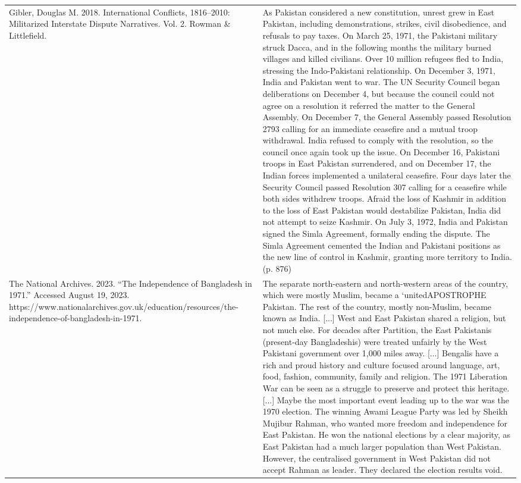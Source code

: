 {\begin{longtable}{p{}p{}}
Gibler, Douglas M. 2018. International Conflicts, 1816–2010: Militarized Interstate Dispute Narratives. Vol. 2. Rowman \& Littlefield. & As Pakistan considered a new constitution, unrest grew in East Pakistan, including demonstrations, strikes, civil disobedience, and refusals to pay taxes. On March 25, 1971, the Pakistani military struck Dacca, and in the following months the military burned villages and killed civilians. Over 10 million refugees fled to India, stressing the Indo-Pakistani relationship. On December 3, 1971, India and Pakistan went to war. The UN Security Council began deliberations on December 4, but because the council could not agree on a resolution it referred the matter to the General Assembly. On December 7, the General Assembly passed Resolution 2793 calling for an immediate ceasefire and a mutual troop withdrawal. India refused to comply with the resolution, so the council once again took up the issue. On December 16, Pakistani troops in East Pakistan surrendered, and on December 17, the Indian forces implemented a unilateral ceasefire. Four days later the Security Council passed Resolution 307 calling for a ceasefire while both sides withdrew troops. Afraid the loss of Kashmir in addition to the loss of East Pakistan would destabilize Pakistan, India did not attempt to seize Kashmir. On July 3, 1972, India and Pakistan signed the Simla Agreement, formally ending the dispute. The Simla Agreement cemented the Indian and Pakistani positions as the new line of control in Kashmir, granting more territory to India. (p. 876)
\\
The National Archives. 2023. “The Independence of Bangladesh in 1971.” Accessed August 19, 2023. https://www.nationalarchives.gov.uk/education/resources/the-independence-of-bangladesh-in-1971. & The separate north-eastern and north-western areas of the country, which were mostly Muslim, became a ‘unitedAPOSTROPHE Pakistan. The rest of the country, mostly non-Muslim, became known as India. [...] West and East Pakistan shared a religion, but not much else. For decades after Partition, the East Pakistanis (present-day Bangladeshis) were treated unfairly by the West Pakistani government over 1,000 miles away. [...] Bengalis have a rich and proud history and culture focused around language, art, food, fashion, community, family and religion. The 1971 Liberation War can be seen as a struggle to preserve and protect this heritage. [...] Maybe the most important event leading up to the war was the 1970 election. The winning Awami League Party was led by Sheikh Mujibur Rahman, who wanted more freedom and independence for East Pakistan. He won the national elections by a clear majority, as East Pakistan had a much larger population than West Pakistan. However, the centralised government in West Pakistan did not accept Rahman as leader. They declared the election results void. 

\end{longtable}}
